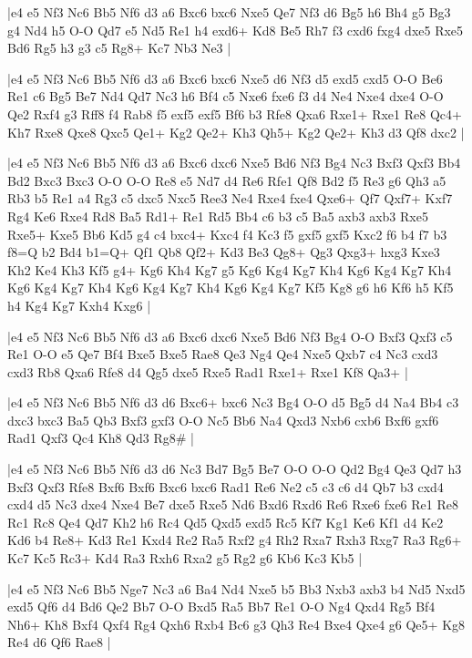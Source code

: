 \whitename{}
\blackname{}
\makegametitle
|e4 e5 Nf3 Nc6 Bb5 Nf6 d3 a6 Bxc6 bxc6 Nxe5 Qe7 Nf3 d6 Bg5 h6 Bh4 g5 Bg3 g4 Nd4 h5 O-O Qd7 e5 Nd5 Re1 h4 exd6+ Kd8 Be5 Rh7 f3 cxd6 fxg4 dxe5 Rxe5 Bd6 Rg5 h3 g3 c5 Rg8+ Kc7 Nb3 Ne3  |

\whitename{}
\blackname{}
\makegametitle
|e4 e5 Nf3 Nc6 Bb5 Nf6 d3 a6 Bxc6 bxc6 Nxe5 d6 Nf3 d5 exd5 cxd5 O-O Be6 Re1 c6 Bg5 Be7 Nd4 Qd7 Nc3 h6 Bf4 c5 Nxe6 fxe6 f3 d4 Ne4 Nxe4 dxe4 O-O Qe2 Rxf4 g3 Rff8 f4 Rab8 f5 exf5 exf5 Bf6 b3 Rfe8 Qxa6 Rxe1+ Rxe1 Re8 Qc4+ Kh7 Rxe8 Qxe8 Qxc5 Qe1+ Kg2 Qe2+ Kh3 Qh5+ Kg2 Qe2+ Kh3 d3 Qf8 dxc2  |

\whitename{}
\blackname{}
\makegametitle
|e4 e5 Nf3 Nc6 Bb5 Nf6 d3 a6 Bxc6 dxc6 Nxe5 Bd6 Nf3 Bg4 Nc3 Bxf3 Qxf3 Bb4 Bd2 Bxc3 Bxc3 O-O O-O Re8 e5 Nd7 d4 Re6 Rfe1 Qf8 Bd2 f5 Re3 g6 Qh3 a5 Rb3 b5 Re1 a4 Rg3 c5 dxc5 Nxc5 Ree3 Ne4 Rxe4 fxe4 Qxe6+ Qf7 Qxf7+ Kxf7 Rg4 Ke6 Rxe4 Rd8 Ba5 Rd1+ Re1 Rd5 Bb4 c6 b3 c5 Ba5 axb3 axb3 Rxe5 Rxe5+ Kxe5 Bb6 Kd5 g4 c4 bxc4+ Kxc4 f4 Kc3 f5 gxf5 gxf5 Kxc2 f6 b4 f7 b3 f8=Q b2 Bd4 b1=Q+ Qf1 Qb8 Qf2+ Kd3 Be3 Qg8+ Qg3 Qxg3+ hxg3 Kxe3 Kh2 Ke4 Kh3 Kf5 g4+ Kg6 Kh4 Kg7 g5 Kg6 Kg4 Kg7 Kh4 Kg6 Kg4 Kg7 Kh4 Kg6 Kg4 Kg7 Kh4 Kg6 Kg4 Kg7 Kh4 Kg6 Kg4 Kg7 Kf5 Kg8 g6 h6 Kf6 h5 Kf5 h4 Kg4 Kg7 Kxh4 Kxg6  |

\whitename{}
\blackname{}
\makegametitle
|e4 e5 Nf3 Nc6 Bb5 Nf6 d3 a6 Bxc6 dxc6 Nxe5 Bd6 Nf3 Bg4 O-O Bxf3 Qxf3 c5 Re1 O-O e5 Qe7 Bf4 Bxe5 Bxe5 Rae8 Qe3 Ng4 Qe4 Nxe5 Qxb7 c4 Nc3 cxd3 cxd3 Rb8 Qxa6 Rfe8 d4 Qg5 dxe5 Rxe5 Rad1 Rxe1+ Rxe1 Kf8 Qa3+  |

\whitename{}
\blackname{}
\makegametitle
|e4 e5 Nf3 Nc6 Bb5 Nf6 d3 d6 Bxc6+ bxc6 Nc3 Bg4 O-O d5 Bg5 d4 Na4 Bb4 c3 dxc3 bxc3 Ba5 Qb3 Bxf3 gxf3 O-O Nc5 Bb6 Na4 Qxd3 Nxb6 cxb6 Bxf6 gxf6 Rad1 Qxf3 Qc4 Kh8 Qd3 Rg8\#  |

\whitename{}
\blackname{}
\makegametitle
|e4 e5 Nf3 Nc6 Bb5 Nf6 d3 d6 Nc3 Bd7 Bg5 Be7 O-O O-O Qd2 Bg4 Qe3 Qd7 h3 Bxf3 Qxf3 Rfe8 Bxf6 Bxf6 Bxc6 bxc6 Rad1 Re6 Ne2 c5 c3 c6 d4 Qb7 b3 cxd4 cxd4 d5 Nc3 dxe4 Nxe4 Be7 dxe5 Rxe5 Nd6 Bxd6 Rxd6 Re6 Rxe6 fxe6 Re1 Re8 Rc1 Rc8 Qe4 Qd7 Kh2 h6 Rc4 Qd5 Qxd5 exd5 Rc5 Kf7 Kg1 Ke6 Kf1 d4 Ke2 Kd6 b4 Re8+ Kd3 Re1 Kxd4 Re2 Ra5 Rxf2 g4 Rh2 Rxa7 Rxh3 Rxg7 Ra3 Rg6+ Kc7 Kc5 Rc3+ Kd4 Ra3 Rxh6 Rxa2 g5 Rg2 g6 Kb6 Kc3 Kb5  |

\whitename{}
\blackname{}
\makegametitle
|e4 e5 Nf3 Nc6 Bb5 Nge7 Nc3 a6 Ba4 Nd4 Nxe5 b5 Bb3 Nxb3 axb3 b4 Nd5 Nxd5 exd5 Qf6 d4 Bd6 Qe2 Bb7 O-O Bxd5 Ra5 Bb7 Re1 O-O Ng4 Qxd4 Rg5 Bf4 Nh6+ Kh8 Bxf4 Qxf4 Rg4 Qxh6 Rxb4 Bc6 g3 Qh3 Re4 Bxe4 Qxe4 g6 Qe5+ Kg8 Re4 d6 Qf6 Rae8  |

